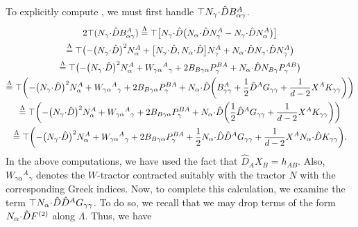 \documentclass[pdftex]{sigma}
\numberwithin{equation}{section}
\newcommand{\hd }{\hat{D}}
\renewcommand{\=}{\stackrel \Lambda =}
\newcommand{\csdot}{\hspace{-0.75mm} \cdot \hspace{-0.75mm}}
\begin{document}
To explicitly compute , we must first handle $\top N_{\gamma} \csdot \hd B^A_{\alpha \gamma}$.
\begin{gather*}
2\top (N_{\gamma} \csdot \hd B^A_{\alpha \gamma}) \= \top \bigl[N_{\gamma} \csdot \hd \bigl(N_{\alpha} \csdot \hd N^A_{\gamma} - N_{\gamma} \csdot \hd N^A_{\alpha}\bigr) \bigr] \\
 \= \top \bigl(- \bigl(N_{\gamma} \csdot \hd\bigr)^2 N^A_{\alpha} + \bigl[N_{\gamma} \csdot \hd, N_{\alpha} \csdot \hd\bigr] N^A_{\gamma} + N_{\alpha} \csdot \hd N_{\gamma} \csdot \hd N^A_{\gamma} \bigr) \\
 \= \top \bigl(- \bigl(N_{\gamma} \csdot \hd\bigr)^2 N^A_{\alpha} + W_{\gamma \alpha}{}^A{}_{\gamma} + 2 B_{B \gamma \alpha} P^{BA}_{\gamma} + N_{\alpha} \csdot \hd N_{B \gamma} P^{AB}_{\gamma} \bigr) \\
 \= \top \biggl(- \bigl(N_{\gamma} \csdot \hd\bigr)^2 N^A_{\alpha} + W_{\gamma \alpha}{}^A{}_{\gamma} + 2 B_{B \gamma \alpha} P^{BA}_{\gamma} + N_{\alpha} \csdot \hd \biggl(B^A_{\gamma \gamma} + \frac{1}{2} \hd^A G_{\gamma \gamma} + \frac{1}{d-2} X^A K_{\gamma \gamma}\biggr) \biggr) \\
 \= \top \biggl(- \bigl(N_{\gamma} \csdot \hd\bigr)^2 N^A_{\alpha} + W_{\gamma \alpha}{}^A{}_{\gamma} + 2 B_{B \gamma \alpha} P^{BA}_{\gamma} + N_{\alpha} \csdot \hd \biggl( \frac{1}{2} \hd^A G_{\gamma \gamma} + \frac{1}{d-2} X^A K_{\gamma \gamma}\biggr) \biggr) \\
 \= \top \biggl(- \bigl(N_{\gamma} \csdot \hd\bigr)^2 N^A_{\alpha} + W_{\gamma \alpha}{}^A{}_{\gamma} + 2 B_{B \gamma \alpha} P^{BA}_{\gamma} + \frac{1}{2} N_{\alpha} \csdot \hd \hd^A G_{\gamma \gamma} + \frac{1}{d-2} X^A N_{\alpha} \csdot \hd K_{\gamma \gamma} \biggr) .
\end{gather*}
In the above computations, we have used the fact that $\hd_A X_B = h_{AB}$. Also, $W_{\gamma \alpha}{}^A{}_{\gamma}$ denotes the $W$-tractor contracted suitably with the tractor $N$ with the corresponding Greek indices. Now, to complete this calculation, we examine the term $\top N_{\alpha} \csdot \hd \hd^A G_{\gamma \gamma}$. To do so, we recall that we may drop terms of the form $N_{\alpha} \csdot \hd F^{(2)}$ along $\Lambda$. Thus, we have
\end{document}

